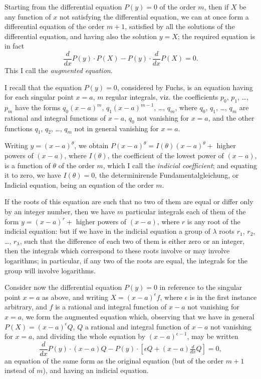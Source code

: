 \documentclass[11pt,a4paper]{book}
\begin{document}
Starting from the differential equation $P(y) = 0$ of the order $m$, then if $X$ be any function of $x$ not satisfying the differential equation, we can at once form a differential equation of the order $m + 1$, satisfied by all the solutions of the differential equation, and having also the solution $y = X$; the required equation is in fact
\[
\frac{d}{dx}P(y) \cdot P(X) - P(y) \cdot \frac{d}{dx}P(X) = 0.
\]
This I call the \textit{augmented equation}.

I recall that the equation $P(y) = 0$, considered by Fuchs, is an equation having for each singular point $x = a$, $m$ regular integrals, viz. the coefficients $p_0$, $p_1$, \ldots, $p_m$ have the forms $q_0(x - a)^m$, $q_1(x - a)^{m-1}$, \ldots, $q_m$, where $q_0$, $q_1$, \ldots, $q_m$ are rational and integral functions of $x - a$, $q_0$ not vanishing for $x = a$, and the other functions $q_1$, $q_2$, \ldots, $q_m$ not in general vanishing for $x = a$.

Writing $y = (x - a)^\theta$, we obtain $P(x - a)^\theta = I(\theta)(x - a)^\theta +$ higher powers of $(x - a)$, where $I(\theta)$, the coefficient of the lowest power of $(x - a)$, is a function of $\theta$ of the order $m$, which I call the \textit{indicial coefficient}; and equating it to zero, we have $I(\theta) = 0$, the determinirende Fundamentalgleichung, or Indicial equation, being an equation of the order $m$.

If the roots of this equation are such that no two of them are equal or differ only by an integer number, then we have $m$ particular integrals each of them of the form $y = (x - a)^r +$ higher powers of $(x - a)$, where $r$ is any root of the indicial equation: but if we have in the indicial equation a group of $\lambda$ roots $r_1$, $r_2$, \ldots, $r_\lambda$, such that the difference of each two of them is either zero or an integer, then the integrals which correspond to these roots involve or may involve logarithms; in particular, if any two of the roots are equal, the integrals for the group will involve logarithms.

Consider now the differential equation $P(y) = 0$ in reference to the singular point $x = a$ as above, and writing $X = (x - a)^\epsilon f$, where $\epsilon$ is in the first instance arbitrary, and $f$ is a rational and integral function of $x - a$ not vanishing for $x = a$, we form the augmented equation which, observing that we have in general $P(X) = (x - a)^\epsilon Q$, $Q$ a rational and integral function of $x - a$ not vanishing for $x = a$, and dividing the whole equation by $(x - a)^{\epsilon - 1}$, may be written
\[
\frac{d}{dx}P(y) \cdot (x - a)Q - P(y) \cdot [\epsilon Q + (x - a)\tfrac{d}{dx}Q] = 0,
\]
an equation of the same form as the original equation (but of the order $m + 1$ instead of $m$), and having an indicial equation.
\end{document}
